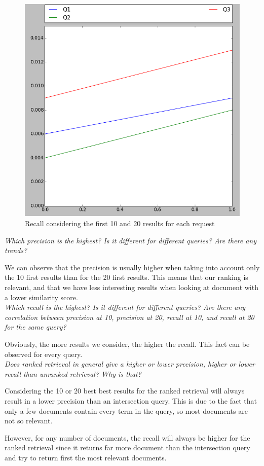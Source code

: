 \begin{itemize}
\begin{figure}[H]
\centering
\includegraphics[width=0.6\linewidth]{img/recall.png}
\caption{Recall considering the first 10 and 20 results for each request}
\end{figure}


\textit{Which precision is the highest? Is it different for different queries? Are there any trends?}

We can observe that the precision is usually higher when taking into account only the 10 first results than for the 20 first results. This means that our ranking is relevant, and that we have less interesting results when looking at document with a lower similarity score.
\\

\textit{Which recall is the highest? Is it different for different queries? Are there any correlation between precision at 10, precision at 20, recall at 10, and recall at 20 for the same query?}

Obviously, the more results we consider, the higher the recall. This fact can be observed for every query.
\\

\textit{Does ranked retrieval in general give a higher or lower precision, higher or lower recall than unranked retrieval? Why is that?}

Considering the 10 or 20 best best results for the ranked retrieval will always result in a lower precision than an intersection query. This is due to the fact that only a few documents contain every term in the query, so most documents are not so relevant.

However, for any number of documents, the recall will always be higher for the ranked retrieval since it returns far more document than the intersection query and try to return first the most relevant documents.



\end{itemize}
